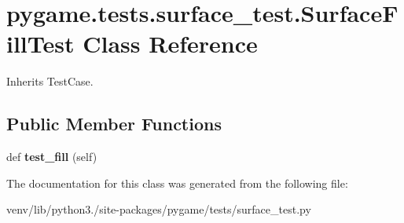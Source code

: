\hypertarget{classpygame_1_1tests_1_1surface__test_1_1_surface_fill_test}{}\section{pygame.\+tests.\+surface\+\_\+test.\+Surface\+Fill\+Test Class Reference}
\label{classpygame_1_1tests_1_1surface__test_1_1_surface_fill_test}


Inherits Test\+Case.

\subsection*{Public Member Functions}
\begin{DoxyCompactItemize}
\item 
\mbox{\label{classpygame_1_1tests_1_1surface__test_1_1_surface_fill_test_a0837fa57904c7bbf8bcf6148eacf29d5}} 
def {\bfseries test\+\_\+fill} (self)
\end{DoxyCompactItemize}


The documentation for this class was generated from the following file\+:\begin{DoxyCompactItemize}
\item 
venv/lib/python3./site-\/packages/pygame/tests/surface\+\_\+test.\+py\end{DoxyCompactItemize}
